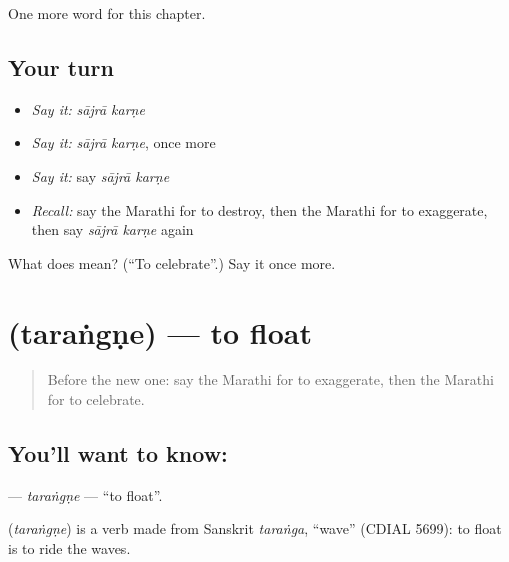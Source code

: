 \begin{grammarlens}[title={What you've built}]
One more word for this chapter.
\end{grammarlens}

\subsection*{Your turn}
\begin{itemize}
\raggedright
  \item \emph{Say it:} \emph{sājrā karṇe}
  \item \emph{Say it:} \emph{sājrā karṇe}, once more
  \item \emph{Say it:} say \emph{sājrā karṇe}
  \item \emph{Recall:} say the Marathi for to destroy, then the Marathi for to exaggerate, then say \emph{sājrā karṇe} again
\end{itemize}

\begin{tcolorbox}[breakable,colback=teal!4,colframe=teal!35!black,title={Before you move on}]
What does   mean? (\textquotedblleft{}To celebrate\textquotedblright{}.) Say it once more.
\end{tcolorbox}
\section[\texorpdfstring{\mr{तरंगणे} (taraṅgṇe)}{तरंगणे (taraṅgṇe)}]{ (taraṅgṇe) — to float}

\label{lesson:MR-C227-tarangne}



\begin{quote}
Before the new one: say the Marathi for to exaggerate, then the Marathi for to celebrate.
\end{quote}

\subsection*{You'll want to know: }
\textbf{} — \emph{taraṅgṇe} — \textquotedblleft{}to float\textquotedblright{}.

\begin{cousinweb}
\textbf{} (\emph{taraṅgṇe}) is a verb made from Sanskrit \emph{taraṅga}, \textquotedblleft{}wave\textquotedblright{} (CDIAL 5699): to float is to ride the waves.
\end{cousinweb}

